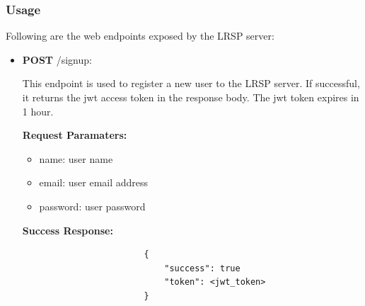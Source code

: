 \documentclass{article}
\begin{document}
        \subsubsection{Usage}
        Following are the web endpoints exposed by the LRSP server:
        \begin{itemize}
            \item \textbf{POST} /signup:
                \begin{addmargin}[1em]{2em}%
                    This endpoint is used to register a new user to the LRSP server. If successful, it returns the jwt access token in the response body. The jwt token expires in 1 hour.
                    \par\textbf{Request Paramaters:}
                    \begin{itemize}
                        \item name: user name
                        \item email: user email address
                        \item password: user password
                    \end{itemize}
                    \par\textbf{Success Response:}
                    \begin{listing}[H]
                    \begin{verbatim}
                        {     
                            "success": true
                            "token": <jwt_token>
                        }
                    \end{verbatim}
                    \end{listing}
                \end{addmargin}
                

\end{itemize}
\end{document}
